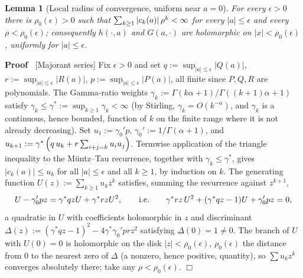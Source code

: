 \documentclass{article}
\newcommand{\assign}{:=}
\newenvironment{proof}{\noindent\textbf{Proof\ }}{\hspace*{\fill}$\Box$\medskip}
\newtheorem{lemma}{Lemma}
{\theorembodyfont{\rmfamily\small}\newtheorem{problem}{Problem}}
\begin{document}
\begin{lemma}
  [Local radius of convergence, uniform near $a = 0$]\label{lem:radius} For
  every $\epsilon > 0$ there is $\rho_0 (\epsilon) > 0$ such that $\sum_{k
  \ge 1} |c_k (a) |  \hspace{0.17em} \rho^k < \infty$ for every $|a | \le
  \epsilon$ and every $\rho < \rho_0 (\epsilon)$; consequently $h (\cdot,
  a)$ and $G (a, \cdot)$ are holomorphic on $|x| < \rho_0 (\epsilon)$,
  uniformly for $|a | \le \epsilon$.
\end{lemma}

\begin{proof}
  [Majorant series] Fix $\epsilon > 0$ and set $q \assign \sup_{|a | \le
  \epsilon} |Q (a) |$, $r \assign \sup_{|a | \le \epsilon} |R (a) |$, $p
  \assign \sup_{|a | \le \epsilon} |P (a) |$, all finite since $P, Q, R$ are
  polynomials. The Gamma-ratio weights $\gamma_k \assign \Gamma (k \alpha +
  1) / \Gamma ((k + 1) \alpha + 1)$ satisfy $\gamma_k \le \gamma^{\ast}
  \assign \sup_{k \ge 1} \gamma_k < \infty$ (by Stirling, $\gamma_k = O
  (k^{- \alpha})$, and $\gamma_k$ is a continuous, hence bounded, function of
  $k$ on the finite range where it is not already decreasing). Set $u_1
  \assign \gamma_0'  p$, $\gamma_0' \assign 1 / \Gamma (\alpha + 1)$, and
  $u_{k + 1} \assign \gamma^{\ast} \left( q \hspace{0.17em} u_k + r
  \sum_{i + j = k} u_i u_j \right)$. Termwise application of the triangle
  inequality to the M{\"u}ntz--Tau recurrence, together with $\gamma_k \le
  \gamma^{\ast}$, gives $|c_k (a) | \le u_k$ for all $|a | \le \epsilon$ and
  all $k \ge 1$, by induction on $k$. The generating function $U (z) \assign
  \sum_{k \ge 1} u_k z^k$ satisfies, summing the recurrence against $z^{k +
  1}$,
  \[ U - \gamma_0'  pz = \gamma^{\ast} qzU + \gamma^{\ast} rzU^2, \qquad
     \text{i.e.} \qquad \gamma^{\ast} rz  \hspace{0.17em} U^2 + (\gamma^{\ast}
     qz - 1) U + \gamma_0'  pz = 0, \]
  a quadratic in $U$ with coefficients holomorphic in $z$ and discriminant
  $\Delta (z) \assign (\gamma^{\ast} qz - 1)^2 - 4 \gamma^{\ast} \gamma_0'
  prz^2$ satisfying $\Delta (0) = 1 \neq 0$. The branch of $U$ with $U (0) =
  0$ is holomorphic on the disk $|z| < \rho_0 (\epsilon)$, $\rho_0
  (\epsilon)$ the distance from $0$ to the nearest zero of $\Delta$ (a
  nonzero, hence positive, quantity), so $\sum u_k z^k$ converges absolutely
  there; take any $\rho < \rho_0 (\epsilon)$.
\end{proof}
\end{document}
